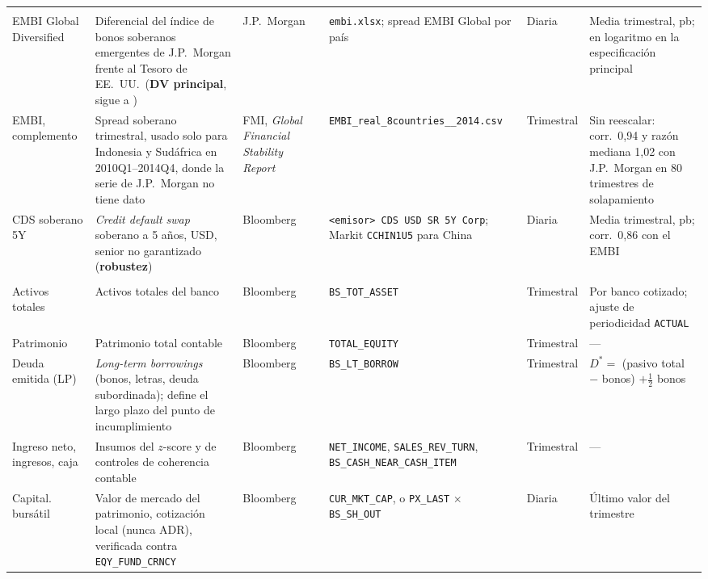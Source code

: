 \begin{footnotesize}
\begin{longtable}{%
  >{\Lc}p{2.15cm}%
  >{\Lc}p{2.7cm}%
  >{\Lc}p{1.8cm}%
  >{\Lc}p{2.85cm}%
  >{\Lc}p{1.75cm}%
  >{\Lc}p{2.5cm}}
\multicolumn{6}{l}{\textbf{\textit{Variable dependiente}}}\\
\addlinespace
EMBI Global Diversified & Diferencial del índice de bonos soberanos emergentes de J.P.\ Morgan frente al Tesoro de EE.\ UU.\ (\textbf{DV principal}, sigue a \citealp{Chari2024b}) & J.P.\ Morgan & \texttt{embi.xlsx}; spread EMBI Global por país & Diaria & Media trimestral, pb; en logaritmo en la especificación principal \\
EMBI, complemento & Spread soberano trimestral, usado solo para Indonesia y Sudáfrica en 2010Q1--2014Q4, donde la serie de J.P.\ Morgan no tiene dato & FMI, \textit{Global Financial Stability Report} & \texttt{EMBI\_real\_\allowbreak 8countries\_\allowbreak 2006\_2014.csv} & Trimestral & Sin reescalar: corr.\ 0,94 y razón mediana 1,02 con J.P.\ Morgan en 80 trimestres de solapamiento \\
CDS soberano 5Y & \textit{Credit default swap} soberano a 5 años, USD, senior no garantizado (\textbf{robustez}) & Bloomberg & \texttt{<emisor> CDS USD SR 5Y Corp}; Markit \texttt{CCHIN1U5} para China & Diaria & Media trimestral, pb; corr.\ 0,86 con el EMBI \\
\addlinespace
\multicolumn{6}{l}{\textbf{\textit{Fragilidad bancaria --- $JLoss$}} (métrica compuesta; motor \texttt{jloss\_engine.py})}\\
\addlinespace
Activos totales & Activos totales del banco & Bloomberg & \texttt{BS\_TOT\_ASSET} & Trimestral & Por banco cotizado; ajuste de periodicidad \texttt{ACTUAL} \\
Patrimonio & Patrimonio total contable & Bloomberg & \texttt{TOTAL\_EQUITY} & Trimestral & --- \\
Deuda emitida (LP) & \textit{Long-term borrowings} (bonos, letras, deuda subordinada); define el largo plazo del punto de incumplimiento & Bloomberg & \texttt{BS\_LT\_BORROW} & Trimestral & $D^{*}=$ (pasivo total $-$ bonos) $+ \tfrac12$ bonos \\
Ingreso neto, ingresos, caja & Insumos del $z$-score y de controles de coherencia contable & Bloomberg & \texttt{NET\_\allowbreak INCOME}, \texttt{SALES\_\allowbreak REV\_\allowbreak TURN}, \texttt{BS\_\allowbreak CASH\_\allowbreak NEAR\_\allowbreak CASH\_\allowbreak ITEM} & Trimestral & --- \\
Capital. bursátil & Valor de mercado del patrimonio, cotización local (nunca ADR), verificada contra \texttt{EQY\_\allowbreak FUND\_\allowbreak CRNCY} & Bloomberg & \texttt{CUR\_\allowbreak MKT\_\allowbreak CAP}, o \texttt{PX\_\allowbreak LAST} $\times$ \texttt{BS\_\allowbreak SH\_\allowbreak OUT} & Diaria & Último valor del trimestre \\

\end{longtable}
\end{footnotesize}
